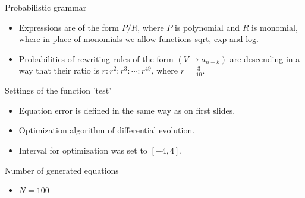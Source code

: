 \documentclass[t,usenames,dvipsnames]{beamer} %
\newcommand{\1}{\boldsymbol{1}}
\newcommand{\0}{\boldsymbol{0}}
\begin{document}
  \begin{frame}{Probabilistic grammar}
      \begin{itemize}
          \item Expressions are of the form 
               $P/R$, where  $P$ is  polynomial and $R$ is monomial, where
               in place of monomials we allow functions sqrt, exp and log.
           \item Probabilities of rewriting rules of the form $(V \to a_{n-k})$  
                are descending in a way that their ratio is 
          $r:r^2:r^3: \cdots :r^{49}$, where $r=\frac{3}{10}$.
      \end{itemize}
  \end{frame}

  \begin{frame}{Settings of the function 'test'}
      \begin{itemize}
          \item Equation error is defined in the same way as on first slides.
          \item Optimization algorithm of differential evolution.
          \item Interval for optimization was set to $[-4, 4]$.
      \end{itemize}
  \end{frame}


  \begin{frame}{Number of generated equations}
      \begin{itemize}
          \item $N = 100$
      \end{itemize}
  \end{frame}
\end{document}

